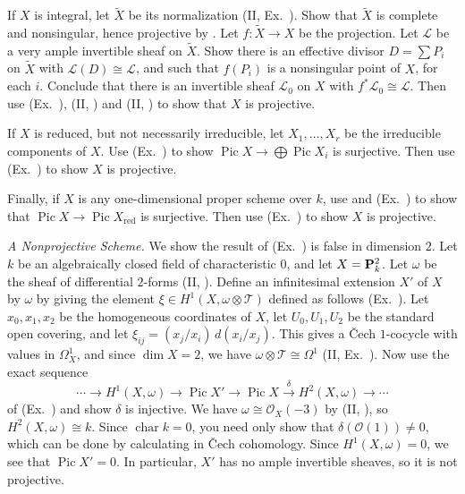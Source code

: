 {{{\noindent\hypertarget{ex-III-5.8b}{}If $X$ is integral, let $\widetilde X$ be its normalization (II, Ex.~). Show that $\widetilde X$ is complete and nonsingular, hence projective by . Let $f\colon\widetilde X\to X$ be the projection. Let $\mathcal L$ be a very ample invertible sheaf on $\widetilde X$. Show there is an effective divisor $D=\sum P_i$ on $\widetilde X$ with $\mathcal L(D)\cong\mathcal L$, and such that $f(P_i)$ is a nonsingular point of $X$, for each $i$. Conclude that there is an invertible sheaf $\mathcal L_0$ on $X$ with $f^*\mathcal L_0\cong\mathcal L$. Then use (Ex.~), (II, ) and (II, ) to show that $X$ is projective.

\noindent\hypertarget{ex-III-5.8c}{}If $X$ is reduced, but not necessarily irreducible, let $X_1,\ldots,X_r$ be the irreducible components of $X$. Use (Ex.~) to show $\operatorname{Pic}X\to\bigoplus\operatorname{Pic}X_i$ is surjective. Then use (Ex.~) to show $X$ is projective.

\noindent\hypertarget{ex-III-5.8d}{}Finally, if $X$ is any one-dimensional proper scheme over $k$, use  and (Ex.~) to show that $\operatorname{Pic}X\to\operatorname{Pic}X_{\mathrm{red}}$ is surjective. Then use (Ex.~) to show $X$ is projective.\par}

\smallskip
\noindent\hypertarget{ex-III-5.9}{}\emph{A Nonprojective Scheme.} We show the result of (Ex.~) is false in dimension $2$. Let $k$ be an algebraically closed field of characteristic $0$, and let $X=\mathbf{P}_k^2$. Let $\omega$ be the sheaf of differential $2$-forms (II, ). Define an infinitesimal extension $X'$ of $X$ by $\omega$ by giving the element $\xi\in H^1(X,\omega\otimes\mathcal T)$ defined as follows (Ex.~). Let $x_0,x_1,x_2$ be the homogeneous coordinates of $X$, let $U_0,U_1,U_2$ be the standard open covering, and let $\xi_{ij}=(x_j/x_i)\,d(x_i/x_j)$. This gives a \v{C}ech $1$-cocycle with values in $\Omega_X^1$, and since $\dim X=2$, we have $\omega\otimes\mathcal T\cong\Omega^1$ (II, Ex.~). Now use the exact sequence
\[
\cdots\to H^1(X,\omega)\to\operatorname{Pic}X'\to\operatorname{Pic}X\xrightarrow{\delta}H^2(X,\omega)\to\cdots
\]
of (Ex.~) and show $\delta$ is injective. We have $\omega\cong\mathcal O_X(-3)$ by (II, ), so $H^2(X,\omega)\cong k$. Since $\operatorname{char}k=0$, you need only show that $\delta(\mathcal O(1))\ne0$, which can be done by calculating in \v{C}ech cohomology. Since $H^1(X,\omega)=0$, we see that $\operatorname{Pic}X'=0$. In particular, $X'$ has no ample invertible sheaves, so it is not projective.

}}
